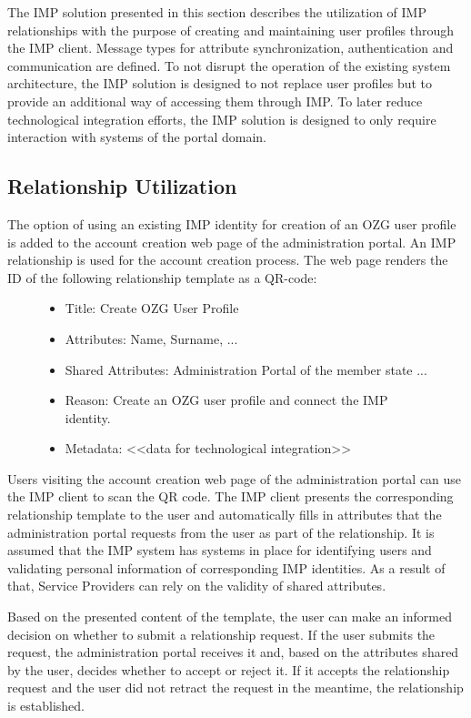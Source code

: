 The IMP solution presented in this section describes the utilization of IMP relationships with the purpose of creating and maintaining user profiles through the IMP client. Message types for attribute synchronization, authentication and communication are defined. To not disrupt the operation of the existing system architecture, the IMP solution is designed to not replace user profiles but to provide an additional way of accessing them through IMP. To later reduce technological integration efforts, the IMP solution is designed to only require interaction with systems of the portal domain.

\subsection{Relationship Utilization}
The option of using an existing IMP identity for creation of an OZG user profile is added to the account creation web page of the administration portal. An IMP relationship is used for the account creation process. The web page renders the ID of the following relationship template as a QR-code: 

\begin{figure}[H]
\begin{itemize}
    \item Title: Create OZG User Profile
    \item Attributes: Name, Surname, ... 
    \item Shared Attributes: Administration Portal of the member state ...
    \item Reason: Create an OZG user profile and connect the IMP identity.
    \item Metadata: <<data for technological integration>>
\end{itemize}
\end{figure}

Users visiting the account creation web page of the administration portal can use the IMP client to scan the QR code. The IMP client presents the corresponding relationship template to the user and automatically fills in attributes that the administration portal requests from the user as part of the relationship. It is assumed that the IMP system has systems in place for identifying users and validating personal information of corresponding IMP identities. As a result of that, Service Providers can rely on the validity of shared attributes.

Based on the presented content of the template, the user can make an informed decision on whether to submit a relationship request. If the user submits the request, the administration portal receives it and, based on the attributes shared by the user, decides whether to accept or reject it. If it accepts the relationship request and the user did not retract the request in the meantime, the relationship is established.


